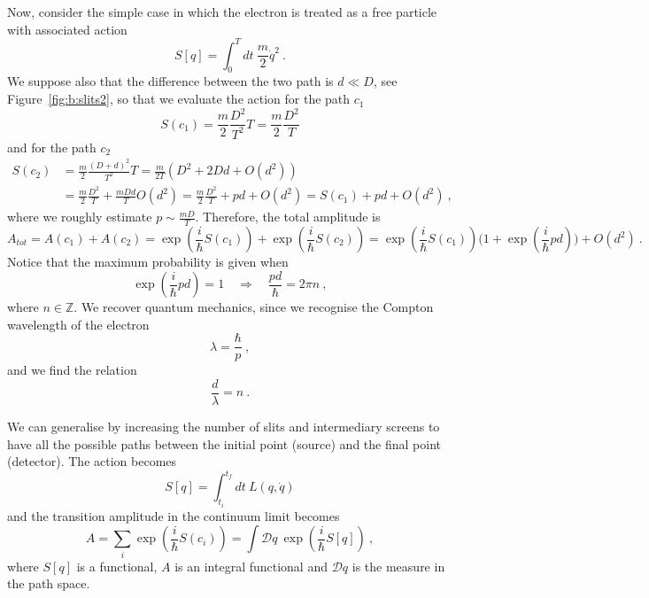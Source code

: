     Now, consider the simple case in which the electron is treated as  a free particle with associated action 
    \begin{equation*}
        S[q] = \int_0^T dt ~ \frac{m}{2} \dot q^2 ~.
    \end{equation*}
    We suppose also that the difference between the two path is $d \ll D$, see Figure~\ref{fig:b:slits2}, so that we evaluate the action for the path $c_1$ 
    \begin{equation*}
        S(c_1) = \frac{m}{2} \frac{D^2}{T^2} T = \frac{m}{2} \frac{D^2}{T}
    \end{equation*}
    and for the path $c_2$ 
    \begin{equation*}
    \begin{aligned}
        S(c_2) & = \frac{m}{2} \frac{(D+d)^2}{T^2} T = \frac{m}{2T} (D^2 + 2 D d + O(d^2)) \\ & = \frac{m}{2} \frac{D^2}{T} + \frac{m D d}{T} O(d^2) = \frac{m}{2} \frac{D^2}{T} + pd + O(d^2) = S(c_1) + pd + O(d^2) ~,
    \end{aligned}
    \end{equation*}
    where we roughly estimate $p \sim \frac{m D}{T}$. Therefore, the total amplitude is 
    \begin{equation*}
        A_{tot} = A(c_1) + A(c_2) = \exp (\frac{i}{\hbar} S(c_1)) + \exp (\frac{i}{\hbar} S(c_2)) = \exp (\frac{i}{\hbar} S(c_1)) \Big (1 + \exp (\frac{i}{\hbar} pd) \Big) + O(d^2) ~. 
    \end{equation*}
    Notice that the maximum probability is given when 
    \begin{equation*}
        \exp(\frac{i}{\hbar} pd) = 1 \quad \Rightarrow \quad \frac{pd}{\hbar} = 2 \pi n ~,
    \end{equation*}
    where $n \in \mathbb Z$. We recover quantum mechanics, since we recognise the Compton wavelength of the electron
    \begin{equation*}
        \lambda = \frac{\hbar}{p} ~,
    \end{equation*}
    and we find the relation 
    \begin{equation*}
        \frac{d}{\lambda} = n ~.
    \end{equation*}

    We can generalise by increasing the number of slits and intermediary screens to have all the possible paths between the initial point (source) and the final point (detector). The action becomes 
    \begin{equation*}
        S[q] = \int_{t_i}^{t_f} dt ~L(q, \dot q) 
    \end{equation*}
    and the transition amplitude in the continuum limit becomes
    \begin{equation*}
        A = \sum_i \exp(\frac{i}{\hbar} S(c_i)) = \int \mathcal D q ~ \exp (\frac{i}{\hbar} S[q]) ~,
    \end{equation*}
    where $S[q]$ is a functional, $A$ is an integral functional and $\mathcal D q$ is the measure in the path space.


